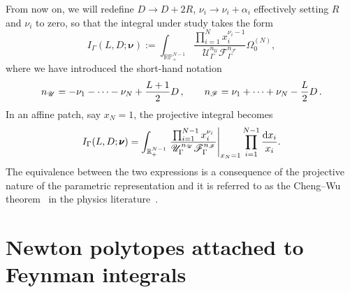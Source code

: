 \documentclass[12pt,a4paper]{article}
\theoremstyle{plain}
\theoremstyle{remark}
\newcommand{\nprops}{N}
\newcommand{\feynpar}{x}
\newcommand{\dd}{\mathrm{d}}
\newcommand{\cU}{\mathscr {U}}
\newcommand{\cF}{\mathscr {F}}
\newcommand{\undernotation}[1]{\pmb{#1}}
\begin{document}
		From now on, we will redefine $D \to D + 2R$, $\nu_i \to \nu_i + \alpha_i$ effectively setting $R$ and $\nu_i$ to zero, so that the integral under study takes the form
		\begin{equation}
			I_\Gamma (L,D;\undernotation{\nu}) :=
			\int_{\mathbb R\mathbb P_+^{\nprops-1}} \frac{\prod_{i=1}^{\nprops}
			{\feynpar_i^{\nu_i-1}}}{\mathscr{U}_\Gamma^{n_\cU} \mathscr{F}_\Gamma^{n_\cF}}
			  \Omega_0^{(\nprops)} ,
			\label{parametric-integral-projective}
		\end{equation}
		where we have introduced the short-hand notation 
		\begin{equation}
			n_\cU=	- \nu_1-\cdots-\nu_\nprops+{L+1\over2}D\, , \qquad 
			n_\cF=\nu_1+\cdots+\nu_\nprops-{L\over2}D\, .
            \label{definitionsofpowers}
		\end{equation}
                In an affine patch, say $\feynpar_\nprops=1$, the
                projective integral becomes
		\begin{equation}
			I_\Gamma (L,D;\undernotation{\nu}) =
			\int_{\mathbb{R}^{\nprops-1}_+} \left. \frac{\prod_{i=1}^{\nprops-1}
			{\feynpar_i^{\nu_i}}}{\mathscr{U}_\Gamma^{n_\cU} \mathscr{F}_\Gamma^{n_\cF}} \right|_{\feynpar_\nprops = 1}
			\prod_{i=1}^{\nprops-1}
		 {\dd x_i\over x_i}.
			\label{parametric-integral-affine}
		\end{equation}
	The equivalence between the two expressions is a consequence
 of the projective nature of the parametric representation and it is 
referred to as the Cheng--Wu theorem~\cite[App.~C.10]{Cheng:1987ga} in the physics literature~\cite{Panzer:2015ida,Weinzierl:2022eaz}.

        
		\section{Newton polytopes attached to Feynman integrals}\label{sec:newton}
\end{document}
